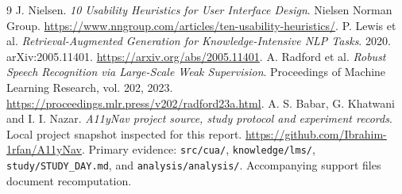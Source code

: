 \documentclass[11pt,a4paper]{article}
\begin{document}
\clearpage{}
\begin{thebibliography}{9}
 J. Nielsen. \emph{10 Usability Heuristics for User Interface Design}. Nielsen Norman Group. \url{https://www.nngroup.com/articles/ten-usability-heuristics/}.
 P. Lewis et al. \emph{Retrieval-Augmented Generation for Knowledge-Intensive NLP Tasks}. 2020. arXiv:2005.11401. \url{https://arxiv.org/abs/2005.11401}.
 A. Radford et al. \emph{Robust Speech Recognition via Large-Scale Weak Supervision}. Proceedings of Machine Learning Research, vol. 202, 2023. \url{https://proceedings.mlr.press/v202/radford23a.html}.
 A. S. Babar, G. Khatwani and I. I. Nazar. \emph{A11yNav project source, study protocol and experiment records}. Local project snapshot inspected for this report. \url{https://github.com/Ibrahim-1rfan/A11yNav}. Primary evidence: \texttt{src/cua/}, \texttt{knowledge/lms/}, \texttt{study/STUDY\_DAY.md}, and \texttt{analysis/analysis/}. Accompanying support files document recomputation.
\end{thebibliography}
\end{document}
